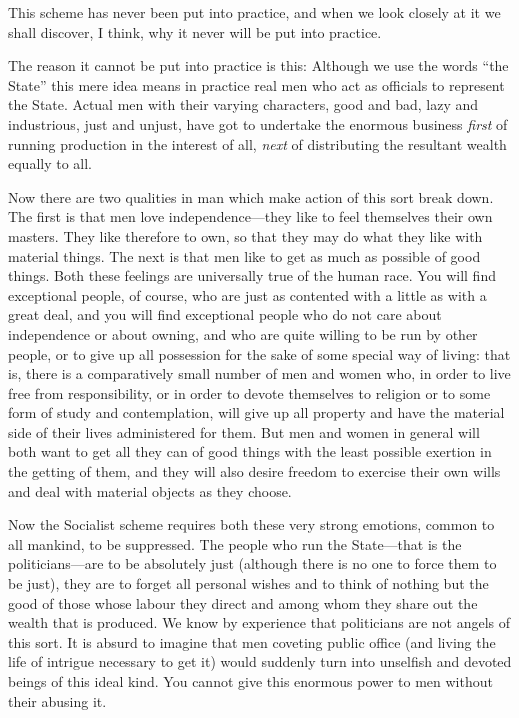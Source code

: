 \documentclass{book}
\begin{document}
This scheme has never been put into practice, and when we look closely at it we shall discover, I think, why it never will be put into practice.

The reason it cannot be put into practice is this: Although we use the words “the State” this mere idea means in practice real men who act as officials to represent the State. Actual men with their varying characters, good and bad, lazy and industrious, just and unjust, have got to undertake the enormous business \emph{first} of running production in the interest of all, \emph{next} of distributing the resultant wealth equally to all.

Now there are two qualities in man which make action of this sort break down. The first is that men love independence—they like to feel themselves their own masters. They like therefore to own, so that they may do what they like with material things. The next is that men like to get as much as possible of good things. Both these feelings are universally true of the human race. You will find exceptional people, of course, who are just as contented with a little as with a great deal, and you will find exceptional people who do not care about independence or about owning, and who are quite willing to be run by other people, or to give up all possession for the sake of some special way of living: that is, there is a comparatively small number of men and women who, in order to live free from responsibility, or in order to devote themselves to religion or to some form of study and contemplation, will give up all property and have the material side of their lives administered for them. But men and women in general will both want to get all they can of good things with the least possible exertion in the getting of them, and they will also desire freedom to exercise their own wills and deal with material objects as they choose.

Now the Socialist scheme requires both these very strong emotions, common to all mankind, to be suppressed. The people who run the State—that is the politicians—are to be absolutely just (although there is no one to force them to be just), they are to forget all personal wishes and to think of nothing but the good of those whose labour they direct and among whom they share out the wealth that is produced. We know by experience that politicians are not angels of this sort. It is absurd to imagine that men coveting public office (and living the life of intrigue necessary to get it) would suddenly turn into unselfish and devoted beings of this ideal kind. You cannot give this enormous power to men without their abusing it.
\end{document}
